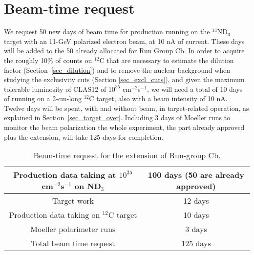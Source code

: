 \section{Beam-time request}

We request 50 new days of beam time for production running on the $^{14}$ND$_3$ target with an 11-GeV polarized electron beam, at 10 nA of current. These days will be added to the 50 already allocated for Run Group Cb. 
In order to acquire the roughly 10\% of counts on $^{12}$C that are necessary to estimate the dilution factor (Section~\ref{sec_dilution}) and to remove the nuclear background when studying the exclusivity cuts (Section \ref{sec_excl_cuts}), and given the maximum tolerable luminosity of CLAS12 of $10^{35}$ cm$^{-2}$s$^{-1}$, we will need a total of 10 days of running on a 2-cm-long $^{12}$C target, also with a beam intensity of 10 nA. 
Twelve days will be spent, with and without beam, in target-related operation, as explained in Section~\ref{sec_target_over}. 
Including 3 days of Moeller runs to monitor the beam polarization the whole experiment, the part already approved plus the extension, will take 125 days for completion. 


\begin{table}
\begin{center}
\begin{tabular}{|c||c|}
\hline
Production data taking at $10^{35}$ cm$^{-2}$s$^{-1}$ on ND$_3$ & 100 days (50 are already approved)\\
\hline
Target work & 12 days\\
\hline
Production data taking on $^{12}$C target & 10 days\\
\hline 
Moeller polarimeter runs & 3 days\\
\hline
\hline
Total beam time request & 125 days\\
\hline
\end{tabular}
\caption{Beam-time request for the extension of Run-group Cb. }
\label{beam_time}
\end{center}
\end{table}

